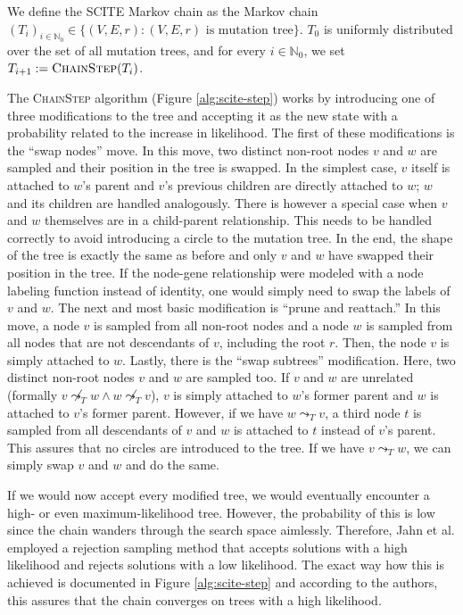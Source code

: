 \begin{definition}
    We define the \ac{SCITE} Markov chain as the Markov chain $(T_i)_{i \in \mathbb{N}_0} \in \{(V, E, r) : (V, E, r) \text{ is mutation tree}\}$. $T_0$ is uniformly distributed over the set of all mutation trees, and for every $i \in \mathbb{N}_0$, we set $T_{i+1} := \textsc{ChainStep}(T_i)$.
\end{definition}

The \textsc{ChainStep} algorithm (Figure \ref{alg:scite-step}) works by introducing one of three modifications to the tree and accepting it as the new state with a probability related to the increase in likelihood. The first of these modifications is the ``swap nodes'' move. In this move, two distinct non-root nodes $v$ and $w$ are sampled and their position in the tree is swapped. In the simplest case, $v$ itself is attached to $w$'s parent and $v$'s previous children are directly attached to $w$; $w$ and its children are handled analogously. There is however a special case when $v$ and $w$ themselves are in a child-parent relationship. This needs to be handled correctly to avoid introducing a circle to the mutation tree. In the end, the shape of the tree is exactly the same as before and only $v$ and $w$ have swapped their position in the tree. If the node-gene relationship were modeled with a node labeling function instead of identity, one would simply need to swap the labels of $v$ and $w$. The next and most basic modification is ``prune and reattach.'' In this move, a node $v$ is sampled from all non-root nodes and a node $w$ is sampled from all nodes that are not descendants of $v$, including the root $r$. Then, the node $v$ is simply attached to $w$. Lastly, there is the ``swap subtrees'' modification. Here, two distinct non-root nodes $v$ and $w$ are sampled too. If $v$ and $w$ are unrelated (formally $v \not\leadsto_T w \wedge w \not\leadsto_T v$), $v$ is simply attached to $w$'s former parent and $w$ is attached to $v$'s former parent. However, if we have $w \leadsto_T v$, a third node $t$ is sampled from all descendants of $v$ and $w$ is attached to $t$ instead of $v$'s parent. This assures that no circles are introduced to the tree. If we have $v \leadsto_T w$, we can simply swap $v$ and $w$ and do the same.

If we would now accept every modified tree, we would eventually encounter a high- or even maximum-likelihood tree. However, the probability of this is low since the chain wanders through the search space aimlessly. Therefore, Jahn et al. employed a rejection sampling method that accepts solutions with a high likelihood and rejects solutions with a low likelihood. The exact way how this is achieved is documented in Figure \ref{alg:scite-step} and according to the authors, this assures that the chain converges on trees with a high likelihood.
    
